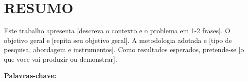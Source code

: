 \chapter*{RESUMO}

Este trabalho apresenta [descreva o contexto e o problema em 1-2 frases].
O objetivo geral e [repita seu objetivo geral].
A metodologia adotada e [tipo de pesquisa, abordagem e instrumentos].
Como resultados esperados, pretende-se [o que voce vai produzir ou demonstrar].

\vspace{0.5cm}
\noindent\textbf{Palavras-chave:} \opalavraschave
\cleardoublepage
